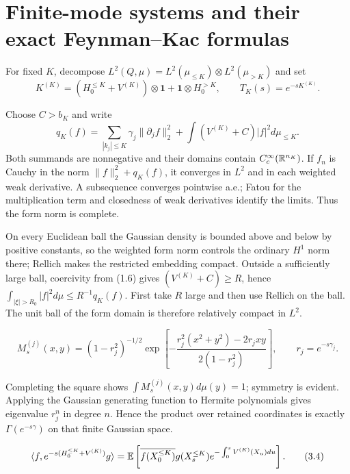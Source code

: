 \documentclass[11pt,a4paper]{article}
\begin{document}
\section{Finite-mode systems and their exact Feynman--Kac formulas}

For fixed $K$, decompose
$L^2(Q,\mu)=L^2(\mu_{\le K})\otimes L^2(\mu_{>K})$ and set
\[
 K^{(K)}=(H_0^{\le K}+V^{(K)})\otimes\mathbf1
 +\mathbf1\otimes H_0^{>K},\qquad T_K(s)=e^{-sK^{(K)}}.
\tag{3.1}
\]



\Because Choose $C>b_K$ and write
\[
 q_K(f)=\sum_{|k_j|\le K}\gamma_j\|\partial_jf\|_2^2
 +\int(V^{(K)}+C)|f|^2d\mu_{\le K}.
\tag{3.2}
\]
Both summands are nonnegative and their domains contain
$C_c^\infty(\mathbb R^{n_K})$.  If $f_n$ is Cauchy in the norm
$\|f\|_2^2+q_K(f)$, it converges in $L^2$ and in each weighted weak derivative.
A subsequence converges pointwise a.e.; Fatou for the multiplication term and
closedness of weak derivatives identify the limits.  Thus the form norm is
complete.


\Because On every Euclidean ball the Gaussian density is bounded above and below
by positive constants, so the weighted form norm controls the ordinary $H^1$ norm
there; Rellich makes the restricted embedding compact.  Outside a sufficiently
large ball, coercivity from (1.6) gives
$(V^{(K)}+C)\ge R$, hence
$\int_{|\xi|>R_0}|f|^2d\mu\le R^{-1}q_K(f)$.  First take $R$ large and then
use Rellich on the ball.  The unit ball of the form domain is therefore relatively
compact in $L^2$.

\[
 M_s^{(j)}(x,y)=(1-r_j^2)^{-1/2}
 \exp\left[-\frac{r_j^2(x^2+y^2)-2r_jxy}{2(1-r_j^2)}\right],
 \qquad r_j=e^{-s\gamma_j}.
\tag{3.3}
\]

\Because Completing the square shows
$\int M_s^{(j)}(x,y)d\mu(y)=1$; symmetry is evident.  Applying the Gaussian
generating function to Hermite polynomials gives eigenvalue $r_j^n$ in degree
$n$.  Hence the product over retained coordinates is exactly
$\Gamma(e^{-s\gamma})$ on that finite Gaussian space.

\[
 \langle f,e^{-s(H_0^{\le K}+V^{(K)})}g\rangle
 =\mathbb E\left[\overline{f(X_0^{\le K})}g(X_s^{\le K})
 e^{-\int_0^sV^{(K)}(X_u)du}\right].
\tag{3.4}
\]
\end{document}
